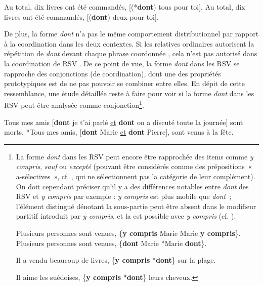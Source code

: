 \ea \label{ch3:ex21}
\ea
Au total, dix livres ont été commandés, [(*\textbf{dont}) tous pour toi]. \label{ch3:ex21a}
\ex
Au total, dix livres ont été commandés, [(\textbf{dont}) deux pour toi]. \label{ch3:ex21b}
\z 
\z 

De plus, la forme \textit{dont} n’a pas le même comportement distributionnel par rapport à la coordination dans les deux contextes. Si les relatives ordinaires autorisent la répétition de \textit{dont} devant chaque phrase coordonnée , cela n’est pas autorisé dans la coordination de RSV . De ce point de vue, la forme \textit{dont} dans les RSV se rapproche des conjonctions (de coordination), dont une des propriétés prototypiques est de ne pas pouvoir se combiner entre elles. En dépit de cette ressemblance, une étude détaillée reste à faire pour voir si la forme \textit{dont} dans les RSV peut être analysée comme conjonction\footnote{La forme \textit{dont} dans les RSV peut encore être rapprochée des items comme \textit{y compris}, \textit{sauf} ou \textit{excepté} (pouvant être considérés comme des prépositions~« a-sélectives~», cf. \citealt{Melis2001}, qui ne sélectionnent pas la catégorie de leur complément). On doit cependant préciser qu’il y a des différences notables entre \textit{dont} des RSV et \textit{y compris} par exemple :  \textit{y compris} est plus mobile que \textit{dont~};  l’élément distingué dénotant la sous-partie peut être absent dans le modifieur partitif introduit par \textit{y compris}, et  la  est possible avec \textit{y compris} (cf. \citealt{Laurens2007}). 

\ea \label{ch3:fn6i}
\ea
Plusieurs personnes sont venues, \{\textbf{y compris} Marie {\textbar} Marie \textbf{y compris}\}.
\ex 
Plusieurs personnes sont venues, \{\textbf{dont} Marie {\textbar} *Marie \textbf{dont}\}.
\z 
\z 

\ea \label{ch3:fn6ii}
Il a vendu beaucoup de livres, \{\textbf{y compris} {\textbar} *\textbf{dont}\} sur la plage.
\z 

\ea \label{ch3:fn6iii}
Il aime les suédoises, \{\textbf{y compris} {\textbar} *\textbf{dont}\} leurs cheveux.
\z 
}. 


\ea \label{ch3:ex22}
\ea
Tous mes amis [\textbf{dont} je t’ai parlé \uline{et} \textbf{dont} on a discuté toute la journée] sont morts. \label{ch3:ex22a}
\ex
*Tous mes amis, [\textbf{dont} Marie \uline{et} \textbf{dont} Pierre], sont venus à la fête. \label{ch3:ex22b}
\z 
\z

